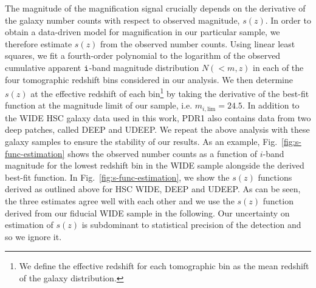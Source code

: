 \documentclass[a4paper,11pt]{article}
\begin{document}
    The magnitude of the magnification signal crucially depends on the derivative of the galaxy number counts with respect to observed magnitude, $s(z)$. In order to obtain a data-driven model for magnification in our particular sample, we therefore estimate $s(z)$ from the observed number counts. Using linear least squares, we fit a fourth-order polynomial to the logarithm of the observed cumulative apparent $\tt{i}$-band magnitude distribution $N(<m, z)$ in each of the four tomographic redshift bins considered in our analysis. We then determine $s(z)$ at the effective redshift of each bin\footnote{We define the effective redshift for each tomographic bin as the mean redshift of the galaxy distribution.} by taking the derivative of the best-fit function at the magnitude limit of our sample, i.e. $m_{i, \mathrm{lim}} = 24.5$. In addition to the WIDE HSC galaxy data used in this work, PDR1 also contains data from two deep patches, called DEEP and UDEEP. We repeat the above analysis with these galaxy samples to ensure the stability of our results. As an example, Fig.~\ref{fig:s-func-estimation} shows the observed number counts as a function of $i$-band magnitude for the lowest redshift bin in the WIDE sample alongside the derived best-fit function. In Fig.~\ref{fig:s-func-estimation}, we show the $s(z)$ functions derived as outlined above for HSC WIDE, DEEP and UDEEP. As can be seen, the three estimates agree well with each other and we use the $s(z)$ function derived from our fiducial WIDE sample in the following. Our uncertainty on estimation of $s(z)$ is subdominant to statistical precision of the detection and so we ignore it.
\end{document}
